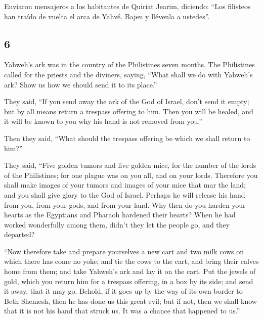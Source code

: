 \begin{paracol}{2}
 Enviaron mensajeros a los habitantes de Quiriat Jearim,
diciendo: ``Los filisteos han traído de vuelta el arca de Yahvé. Bajen y
llévenla a ustedes''.

\switchcolumn
\begin{otherlanguage}{english}

\hypertarget{section-11}{%
\section{6}\label{section-11}}

 Yahweh's ark was in the country of the Philistines seven
months.  The Philistines called for the priests and the
diviners, saying, ``What shall we do with Yahweh's ark? Show us how we
should send it to its place.''

 They said, ``If you send away the ark of the God of
Israel, don't send it empty; but by all means return a trespass offering
to him. Then you will be healed, and it will be known to you why his
hand is not removed from you.''

 Then they said, ``What should the trespass offering be
which we shall return to him?''

They said, ``Five golden tumors and five golden mice, for the number of
the lords of the Philistines; for one plague was on you all, and on your
lords.  Therefore you shall make images of your tumors and
images of your mice that mar the land; and you shall give glory to the
God of Israel. Perhaps he will release his hand from you, from your
gods, and from your land.  Why then do you harden your
hearts as the Egyptians and Pharaoh hardened their hearts? When he had
worked wonderfully among them, didn't they let the people go, and they
departed?

 ``Now therefore take and prepare yourselves a new cart
and two milk cows on which there has come no yoke; and tie the cows to
the cart, and bring their calves home from them;  and take
Yahweh's ark and lay it on the cart. Put the jewels of gold, which you
return him for a trespass offering, in a box by its side; and send it
away, that it may go.  Behold, if it goes up by the way of
its own border to Beth Shemesh, then he has done us this great evil; but
if not, then we shall know that it is not his hand that struck us. It
was a chance that happened to us.''


\end{otherlanguage}
\end{paracol}
